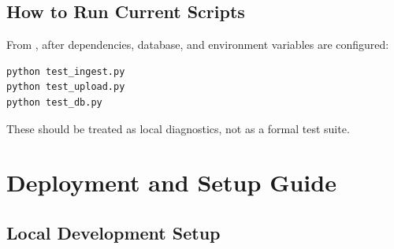 \documentclass[11pt,a4paper]{report}
\newcommand{\code}[1]{\texttt{\detokenize{#1}}}
\begin{document}
\section{How to Run Current Scripts}

From \code{backend/}, after dependencies, database, and environment variables are configured:

\begin{lstlisting}[caption={Manual diagnostic script examples}]
python test_ingest.py
python test_upload.py
python test_db.py
\end{lstlisting}

These should be treated as local diagnostics, not as a formal test suite.

\newpage
\chapter{Deployment and Setup Guide}

\section{Local Development Setup}
\end{document}
